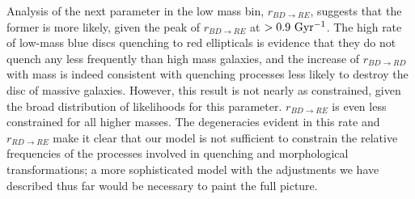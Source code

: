 \documentclass[useAMS,usenatbib]{mn2e}
\begin{document}
 Analysis of the next parameter in the low mass bin, $r_{BD\rightarrow RE}$, suggests that the former is more likely, given the peak of $r_{BD \rightarrow RE}$ at $>0.9 ~\rm Gyr^{-1}$. The high rate of low-mass blue discs quenching to red ellipticals is evidence that they do not quench any less frequently than high mass galaxies, and the increase of $r_{BD \rightarrow RD}$ with mass is indeed consistent with quenching processes less likely to destroy the disc of massive galaxies. However, this result is not nearly as constrained, given the broad distribution of likelihoods for this parameter. $r_{BD \rightarrow RE}$ is even less constrained for all higher masses. The degeneracies evident in this rate and $r_{RD \rightarrow RE}$ make it clear that our model is not sufficient to constrain the relative frequencies of the processes involved in quenching and morphological transformations; a more sophisticated model with the adjustments we have described thus far would be necessary to paint the full picture. 
\end{document}
